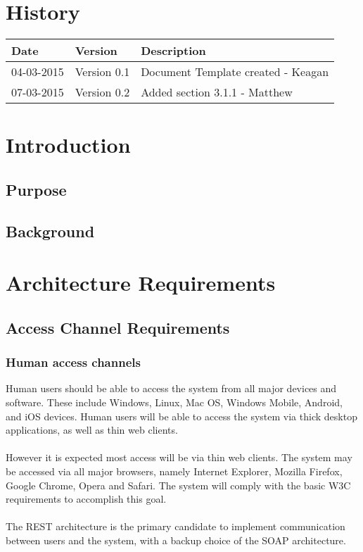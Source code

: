 \documentclass[12pt]{article}
\begin{document}


\section{History}
\begin{tabular}{|l|l|l|}
\hline
Date & Version & Description\\
\hline
04-03-2015 & Version 0.1 & Document Template created - Keagan\\
\hline
07-03-2015 & Version 0.2 & Added section 3.1.1 - Matthew\\
\hline


\end{tabular}

\newpage
\tableofcontents
\newpage

\section{Introduction}

\subsection{Purpose}

\subsection{Background}

\section{Architecture Requirements}
\subsection{Access Channel Requirements}

\subsubsection{Human access channels}
Human users should be able to access the system from all major devices and software. These include Windows, Linux, Mac OS, Windows Mobile, Android, and iOS devices. Human users will be able to access the system via thick desktop applications, as well as thin web clients. 
\\\\However it is expected most access will be via thin web clients.
The system may be accessed via all major browsers, namely Internet Explorer, Mozilla Firefox, Google Chrome, Opera and Safari. The system will comply with the basic W3C requirements to accomplish this goal.
\\\\The REST architecture is the primary candidate to implement communication between users and the system, with a backup choice of the SOAP architecture.
\end{document}
